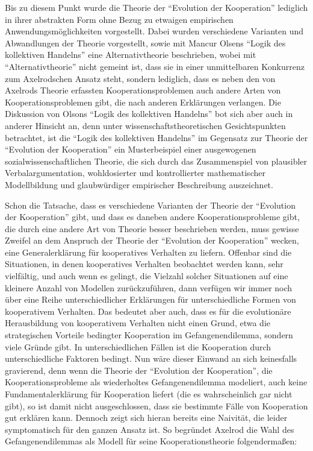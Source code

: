 \documentclass[12pt,a4paper,ngerman]{article}
\begin{document}
Bis zu diesem Punkt wurde die Theorie der "`Evolution der
Kooperation"' lediglich in ihrer abstrakten Form ohne Bezug zu
etwaigen empirischen Anwendungsmöglichkeiten vorgestellt. Dabei wurden
verschiedene Varianten und Abwandlungen der Theorie vorgestellt, sowie
mit Mancur Olsens "`Logik des kollektiven Handelns"' eine
Alternativtheorie beschrieben, wobei mit "`Alternativtheorie"' nicht
gemeint ist, dass sie in einer unmittelbaren Konkurrenz zum
Axelrodschen Ansatz steht, sondern lediglich, dass es neben den von
Axelrods Theorie erfassten Kooperationsproblemen auch andere Arten von
Kooperationsproblemen gibt, die nach anderen Erklärungen verlangen. Die
Diskussion von Olsons "`Logik des kollektiven Handelns"' bot sich aber
auch in anderer Hinsicht an, denn unter wissenschaftstheoretischen
Gesichtspunkten betrachtet, ist die "`Logik des kollektiven Handelns"'
im Gegensatz zur Theorie der "`Evolution der Kooperation"' ein
Musterbeispiel einer ausgewogenen sozialwissenschaftlichen Theorie,
die sich durch das Zusammenspiel von plausibler Verbalargumentation,
wohldosierter und kontrollierter mathematischer Modellbildung und
glaubwürdiger empirischer Beschreibung auszeichnet.

Schon die Tatsache, dass es verschiedene Varianten der Theorie der
"`Evolution der Kooperation"' gibt, und dass es daneben andere
Kooperationsprobleme gibt, die durch eine andere Art von Theorie
besser beschrieben werden, muss gewisse Zweifel an dem Anspruch der
Theorie der "`Evolution der Kooperation"' wecken, eine
Generalerklärung für kooperatives Verhalten zu liefern. Offenbar sind
die Situationen, in denen kooperatives Verhalten beobachtet werden
kann, sehr vielfältig, und auch wenn es gelingt, die Vielzahl solcher
Situationen auf eine kleinere Anzahl von Modellen zurückzuführen, dann
verfügen wir immer noch über eine Reihe unterschiedlicher Erklärungen
für unterschiedliche Formen von kooperativem Verhalten. Das bedeutet
aber auch, dass es für die evolutionäre Herausbildung von kooperativem
Verhalten nicht einen Grund, etwa die strategischen Vorteile bedingter
Kooperation im Gefangenendilemma, sondern viele Gründe gibt. In
unterschiedlichen Fällen ist die Kooperation durch unterschiedliche
Faktoren bedingt. Nun wäre dieser Einwand an sich keinesfalls
gravierend, denn wenn die Theorie der "`Evolution der Kooperation"',
die Kooperationsprobleme als wiederholtes Gefangenendilemma modeliert,
auch keine Fundamentalerklärung für Kooperation liefert (die es
wahrscheinlich gar nicht gibt), so ist damit nicht ausgeschlossen,
dass sie bestimmte Fälle von Kooperation gut erklären kann. Dennoch
zeigt sich hieran bereits eine Naivität, die leider
symptomatisch für den ganzen Ansatz ist. So begründet Axelrod die Wahl
des Gefangenendilemmas als Modell für seine Kooperationstheorie
folgendermaßen:
\end{document}
